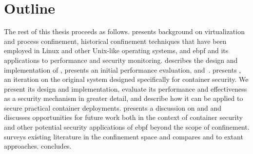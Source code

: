 \section{Outline}%
\label{s:outline}


\begin{inprogress}
The rest of this thesis proceeds as follows.  presents background on
virtualization and process confinement, historical confinement techniques that have been
employed in Linux and other Unix-like operating systems, and \gls{ebpf} and its applications to
performance and security monitoring.  describes the design and
implementation of \bpfbox, presents an initial performance evaluation, and~. 
presents \bpfcontain, an iteration on the original \bpfbox{} system designed
specifically for container security. We present its design and implementation, evaluate
its performance and effectiveness as a security mechanism in greater detail, and describe
how it can be applied to secure practical container deployments. 
presents a discussion on \bpfbox{} and \bpfcontain{} and discusses opportunities for
future work both in the context of container security and other potential security
applications of \gls{ebpf} beyond the scope of confinement.  surveys existing
literature in the confinement space and compares \bpfbox{} and \bpfcontain{} to extant
approaches.  concludes.
\end{inprogress}
